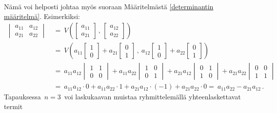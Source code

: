 Nämä voi helposti johtaa myös suoraan  Määritelmästä \ref{determinantin määritelmä}. Esimerkiksi:
\begin{align*}
\begin{vmatrix} 
a_{11} & a_{12} \\ a_{21} & a_{22} 
\end{vmatrix}\ 
       &=\ V\left(\begin{bmatrix} a_{11}\\a_{21} \end{bmatrix}\,,\,
                  \begin{bmatrix} a_{12}\\a_{22} \end{bmatrix}\right) \\[2mm]
       &=\ V\left(a_{11}\begin{bmatrix} 1\\0 \end{bmatrix}
                 +a_{21}\begin{bmatrix} 0\\1 \end{bmatrix}\,,\
                  a_{12}\begin{bmatrix} 1\\0 \end{bmatrix}
                 +a_{22}\begin{bmatrix} 0\\1 \end{bmatrix}\right) \\[2mm]
       &=\ a_{11}a_{12}\begin{vmatrix} 1&1\\0&0 \end{vmatrix}
          +a_{11}a_{22}\begin{vmatrix} 1&0\\0&1 \end{vmatrix}
          +a_{21}a_{12}\begin{vmatrix} 0&1\\1&0 \end{vmatrix}
          +a_{21}a_{22}\begin{vmatrix} 0&0\\1&1 \end{vmatrix} \\[4mm]
       &=\ a_{11}a_{12}\cdot 0 + a_{11}a_{22}\cdot 1 + a_{21}a_{12}\cdot (-1) 
         + a_{21}a_{22}\cdot 0 
        =\ a_{11}a_{22}-a_{21}a_{12}\,.   
\end{align*} 
Tapauksessa $\,n=3\,$ voi laskukaavan muistaa ryhmittelemällä yhteenlaskettavat termit
